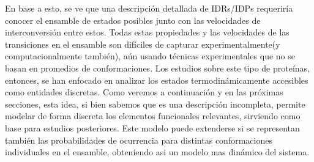 En base a esto, se ve que una descripción detallada de IDRs/IDPs requeriría conocer el ensamble de estados posibles junto con las velocidades de interconversión entre estos.
Todas estas propiedades y las velocidades de las transiciones en el ensamble son difíciles de capturar experimentalmente(y computacionalmente también), aún usando técnicas experimentales que no se basan en promedios de conformaciones.
Los estudios sobre este tipo de proteínas, entonces, se han enfocado en analizar los estados termodinámicamente accesibles como entidades discretas.
Como veremos a continuación y en las próximas secciones, esta idea, si bien sabemos que es una descripción incompleta, permite modelar de forma discreta los elementos funcionales relevantes, sirviendo como base para estudios posteriores.
Este modelo puede extenderse si se representan también las probabilidades de ocurrencia para distintas conformaciones individuales en el ensamble, obteniendo asi un modelo mas dinámico del sistema.






